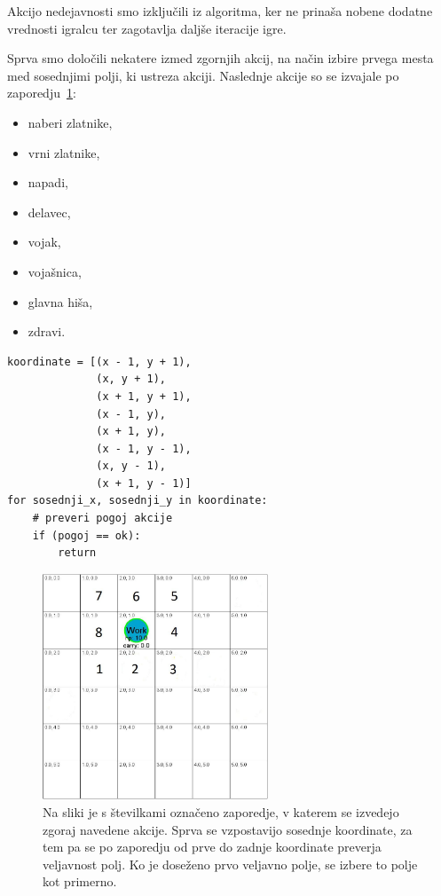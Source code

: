 \documentclass[a4paper, 12pt]{book}
\begin{document}
Akcijo nedejavnosti smo izključili iz algoritma, ker ne prinaša nobene dodatne vrednosti igralcu ter zagotavlja daljše iteracije igre.


Sprva smo določili nekatere izmed zgornjih akcij, na način izbire prvega mesta med sosednjimi polji, ki ustreza akciji. 
Naslednje akcije so se izvajale po zaporedju~\ref{pickorakiPreverjanja}:
\begin{itemize}
	\item naberi zlatnike,
	\item vrni zlatnike,
	\item napadi,
	\item delavec,
	\item vojak, 
	\item vojašnica,
	\item glavna hiša,
	\item zdravi.
\end{itemize}
\begin{verbatim}
koordinate = [(x - 1, y + 1),
              (x, y + 1),
              (x + 1, y + 1),
              (x - 1, y),
              (x + 1, y),
              (x - 1, y - 1),
              (x, y - 1),
              (x + 1, y - 1)]
for sosednji_x, sosednji_y in koordinate:
    # preveri pogoj akcije
    if (pogoj == ok):
        return
\end{verbatim}

\begin{figure}[h]
	\begin{center}
		\includegraphics[width=0.6\textwidth]{photos/korakiPreverjanja.pdf}
	\end{center}
	\caption{Na sliki je s številkami označeno zaporedje, v katerem se izvedejo zgoraj navedene akcije. Sprva se vzpostavijo sosednje koordinate, za tem pa se po zaporedju od prve do zadnje koordinate preverja veljavnost polj. Ko je doseženo prvo veljavno polje, se izbere to polje kot primerno. }
	\label{pickorakiPreverjanja}
\end{figure}
\end{document}
